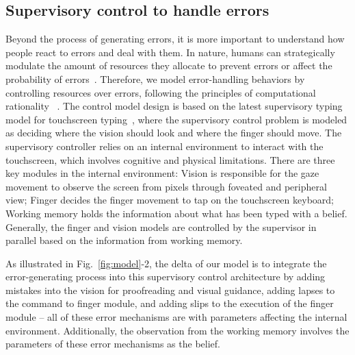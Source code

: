 \subsection{Supervisory control to handle errors}
\label{sec:supervisory-control}

Beyond the process of generating errors, it is more important to understand how people react to errors and deal with them. In nature, humans can strategically modulate the amount of resources they allocate to prevent errors or affect the probability of errors~\cite{anderson2004integrated, fodor1983modularity}.
Therefore, we model error-handling behaviors by controlling resources over errors, following the principles of computational rationality ~\cite{oulasvirta2022computational}. 
The control model design is based on the latest supervisory typing model for touchscreen typing~\cite{shi2024crtypist}, where the supervisory control problem is modeled as deciding where the vision should look and where the finger should move.
The supervisory controller relies on an internal environment to interact with the touchscreen, which involves cognitive and physical limitations.
There are three key modules in the internal environment: Vision is responsible for the gaze movement to observe the screen from pixels through foveated and peripheral view; Finger decides the finger movement to tap on the touchscreen keyboard; Working memory holds the information about what has been typed with a belief. Generally, the finger and vision models are controlled by the supervisor in parallel based on the information from working memory.

As illustrated in Fig.~\ref{fig:model}-2, the delta of our model is to integrate the error-generating process into this supervisory control architecture by adding mistakes into the vision for proofreading and visual guidance, adding lapses to the command to finger module, and adding slips to the execution of the finger module – all of these error mechanisms are with parameters affecting the internal environment. Additionally, the observation from the working memory involves the parameters of these error mechanisms as the belief.


